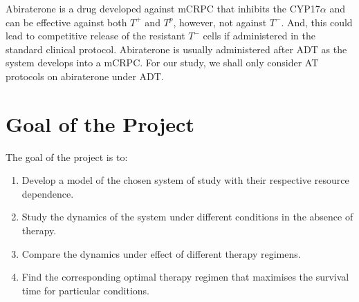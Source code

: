 Abiraterone is a drug developed against mCRPC that inhibits the CYP17$\alpha$ and can be effective against both $T^+$ and $T^p$, however, not against $T^-$. And, this could lead to competitive release of the resistant $T^-$ cells if administered in the standard clinical protocol. Abiraterone is usually administered after ADT as the system develops into a mCRPC. For our study, we shall only consider AT protocols on abiraterone under ADT.

\section{Goal of the Project}
The goal of the project is to:
\begin{enumerate}
  \item Develop a model of the chosen system of study with their respective resource dependence.
  \item Study the dynamics of the system under different conditions in the absence of therapy.
  \item Compare the dynamics under effect of different therapy regimens.
  \item Find the corresponding optimal therapy regimen that maximises the survival time for particular conditions.
\end{enumerate}
